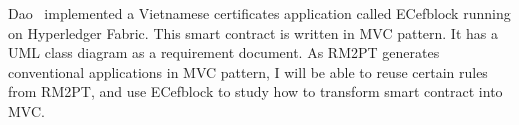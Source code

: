 Dao~\cite{dao2019challenges} implemented a Vietnamese certificates application called ECefblock running on Hyperledger Fabric. This smart contract is written in MVC pattern. It has a UML class diagram as a requirement document. As RM2PT generates conventional applications in MVC pattern, I will be able to reuse certain rules from RM2PT, and use ECefblock to study how to transform smart contract into MVC.





